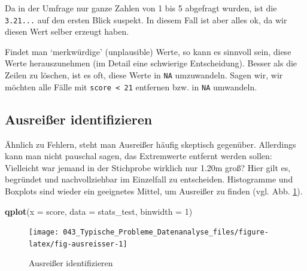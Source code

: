\documentclass[12pt,ngerman,]{book}
\makeatletter
\newenvironment{Shaded}{\begin{snugshade}}{\end{snugshade}}
\newcommand{\KeywordTok}[1]{\textcolor[rgb]{0.13,0.29,0.53}{\textbf{#1}}}
\newcommand{\DataTypeTok}[1]{\textcolor[rgb]{0.13,0.29,0.53}{#1}}
\newcommand{\DecValTok}[1]{\textcolor[rgb]{0.00,0.00,0.81}{#1}}
\newcommand{\StringTok}[1]{\textcolor[rgb]{0.31,0.60,0.02}{#1}}
\newcommand{\OtherTok}[1]{\textcolor[rgb]{0.56,0.35,0.01}{#1}}
\newcommand{\OperatorTok}[1]{\textcolor[rgb]{0.81,0.36,0.00}{\textbf{#1}}}
\newcommand{\NormalTok}[1]{#1}
\newenvironment{kframe}{%
\medskip{}
\setlength{\fboxsep}{.8em}
 \def\at@end@of@kframe{}%
 \ifinner\ifhmode%
  \def\at@end@of@kframe{\end{minipage}}%
  \begin{minipage}{\columnwidth}%
 \fi\fi%
 \def\FrameCommand##1{\hskip\@totalleftmargin \hskip-\fboxsep
 \colorbox{shadecolor}{##1}\hskip-\fboxsep
     \hskip-\linewidth \hskip-\@totalleftmargin \hskip\columnwidth}%
 \MakeFramed {\advance\hsize-\width
   \@totalleftmargin\z@ \linewidth\hsize
   \@setminipage}}%
 {\par\unskip\endMakeFramed%
 \at@end@of@kframe}
\renewenvironment{Shaded}{\begin{kframe}}{\end{kframe}}
\theoremstyle{definition}
\theoremstyle{definition}
\theoremstyle{remark}
\makeatother
\begin{document}
Da in der Umfrage nur ganze Zahlen von 1 bis 5 abgefragt wurden, ist die
\texttt{3.21...} auf den ersten Blick suspekt. In diesem Fall ist aber
alles ok, da wir diesen Wert selber erzeugt haben.

Findet man `merkwürdige' (unplausible) Werte, so kann es sinnvoll sein,
diese Werte herauszunehmen (im Detail eine schwierige Entscheidung).
Besser als die Zeilen zu löschen, ist es oft, diese Werte in \texttt{NA}
umzuwandeln. Sagen wir, wir möchten alle Fälle mit
\texttt{score\ \textless{}\ 21} entfernen bzw. in \texttt{NA} umwandeln.

\begin{Shaded}
\end{Shaded}

\subsection{Ausreißer identifizieren}\label{ausreier-identifizieren}

Ähnlich zu Fehlern, steht man Ausreißer häufig skeptisch gegenüber.
Allerdings kann man nicht pauschal sagen, das Extremwerte entfernt
werden sollen: Vielleicht war jemand in der Stichprobe wirklich nur
1.20m groß? Hier gilt es, begründet und nachvollziehbar im Einzelfall zu
entscheiden. Histogramme und Boxplots sind wieder ein geeignetes Mittel,
um Ausreißer zu finden (vgl. Abb. \ref{fig:fig-ausreisser}).

\begin{Shaded}
\begin{Highlighting}[]
\KeywordTok{qplot}\NormalTok{(}\DataTypeTok{x =}\NormalTok{ score, }\DataTypeTok{data =}\NormalTok{ stats_test, }\DataTypeTok{binwidth =} \DecValTok{1}\NormalTok{)}
\end{Highlighting}
\end{Shaded}

\begin{figure}

{\centering \texttt{[image: 043\_Typische\_Probleme\_Datenanalyse\_files/figure-latex/fig-ausreisser-1]} 

}

\caption{Ausreißer identifizieren}\label{fig:fig-ausreisser}
\end{figure}
\end{document}
